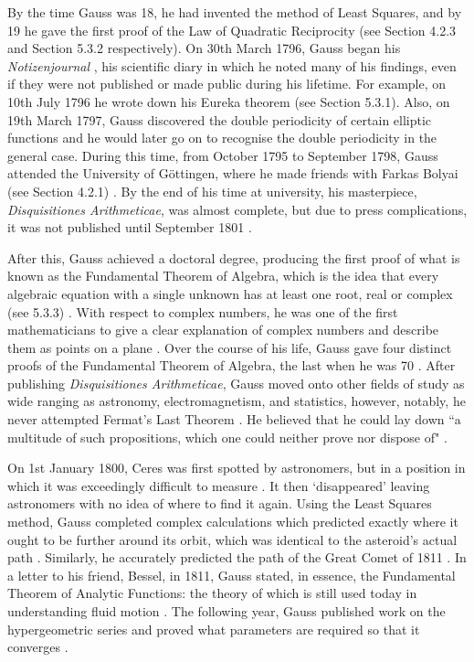 \documentclass{article}
\begin{document}
By the time Gauss was 18, he had invented the method of Least Squares, and by 19 he gave the first proof of the Law of Quadratic Reciprocity \cite{menofmaths} (see Section 4.2.3 and Section 5.3.2 respectively). On 30th March 1796, Gauss began his \textit{Notizenjournal} \cite{menofmaths}, his scientific diary in which he noted many of his findings, even if they were not published or made public during his lifetime. For example, on 10th July 1796 he wrote down his Eureka theorem (see Section 5.3.1). Also, on 19th March 1797, Gauss discovered the double periodicity of certain elliptic functions \cite{menofmaths} and he would later go on to recognise the double periodicity in the general case. During this time, from October 1795 to September 1798, Gauss attended the University of G\"{o}ttingen, where he made friends with Farkas Bolyai (see Section 4.2.1) \cite{menofmaths}. By the end of his time at university, his masterpiece, \textit{Disquisitiones Arithmeticae}, was almost complete, but due to press complications, it was not published until September 1801 \cite{menofmaths}. 

After this, Gauss achieved a doctoral degree, producing the first proof of what is known as the Fundamental Theorem of Algebra, which is the idea that every algebraic equation with a single unknown has at least one root, real or complex (see 5.3.3) \cite{menofmaths}. With respect to complex numbers, he was one of the first mathematicians to give a clear explanation of complex numbers and describe them as points on a plane \cite{menofmaths}. Over the course of his life, Gauss gave four distinct proofs of the Fundamental Theorem of Algebra, the last when he was 70 \cite{menofmaths}. After publishing \textit{Disquisitiones Arithmeticae}, Gauss moved onto other fields of study as wide ranging as astronomy, electromagnetism, and statistics, however, notably, he never attempted Fermat’s Last Theorem \cite{menofmaths}. He believed that he could lay down “a multitude of such propositions, which one could neither prove nor dispose of" \cite{menofmaths}. 

On 1st January 1800, Ceres was first spotted by astronomers, but in a position in which it was exceedingly difficult to measure \cite{menofmaths}. It then ‘disappeared’ leaving astronomers with no idea of where to find it again. Using the Least Squares method, Gauss completed complex calculations which predicted exactly where it ought to be further around its orbit, which was identical to the asteroid’s actual path \cite{menofmaths}. Similarly, he accurately predicted the path of the Great Comet of 1811 \cite{menofmaths}. In a letter to his friend, Bessel, in 1811, Gauss stated, in essence, the Fundamental Theorem of Analytic Functions: the theory of which is still used today in understanding fluid motion \cite{menofmaths}. The following year, Gauss published work on the hypergeometric series and proved what parameters are required so that it converges \cite{menofmaths}.
\end{document}

